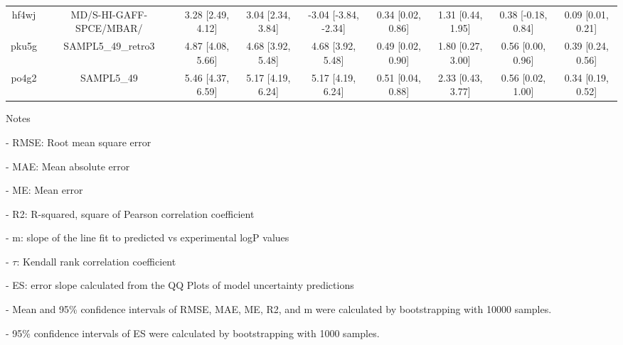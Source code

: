 \documentclass{article}
\begin{document}
\begin{center}
\begin{longtable}{|ccccccccc|}
 hf4wj &                            MD/S-HI-GAFF-SPCE/MBAR/ &  3.28 [2.49, 4.12] &  3.04 [2.34, 3.84] &  -3.04 [-3.84, -2.34] &  0.34 [0.02, 0.86] &    1.31 [0.44, 1.95] &   0.38 [-0.18, 0.84] &     0.09 [0.01, 0.21] \\
 pku5g &                                 SAMPL5\_49\_retro3 &  4.87 [4.08, 5.66] &  4.68 [3.92, 5.48] &     4.68 [3.92, 5.48] &  0.49 [0.02, 0.90] &    1.80 [0.27, 3.00] &    0.56 [0.00, 0.96] &     0.39 [0.24, 0.56] \\
 po4g2 &                                         SAMPL5\_49 &  5.46 [4.37, 6.59] &  5.17 [4.19, 6.24] &     5.17 [4.19, 6.24] &  0.51 [0.04, 0.88] &    2.33 [0.43, 3.77] &    0.56 [0.02, 1.00] &     0.34 [0.19, 0.52] \\
\end{longtable}
\end{center}

Notes

- RMSE: Root mean square error

- MAE: Mean absolute error

- ME: Mean error

- R2: R-squared, square of Pearson correlation coefficient

- m: slope of the line fit to predicted vs experimental logP values

- $\tau$:  Kendall rank correlation coefficient

- ES: error slope calculated from the QQ Plots of model uncertainty predictions

- Mean and 95\% confidence intervals of RMSE, MAE, ME, R2, and m were calculated by bootstrapping with 10000 samples.

- 95\% confidence intervals of ES were calculated by bootstrapping with 1000 samples.\end{document}
\end{document}
